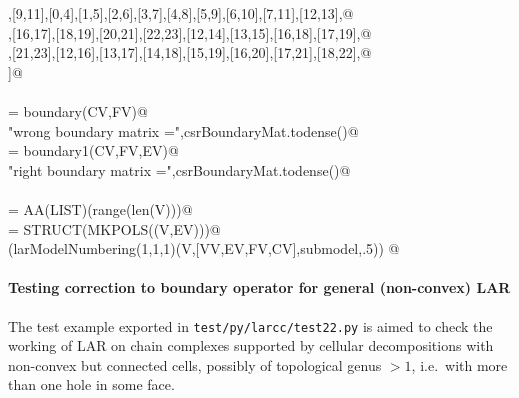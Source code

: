 \documentclass[11pt,oneside]{article}    %
\begin{document}
\begin{flushleft}
\begin{list}{}{}
\mbox{}\verb@[8,10],[9,11],[0,4],[1,5],[2,6],[3,7],[4,8],[5,9],[6,10],[7,11],[12,13],@\\
\mbox{}\verb@[14,15],[16,17],[18,19],[20,21],[22,23],[12,14],[13,15],[16,18],[17,19],@\\
\mbox{}\verb@[20,22],[21,23],[12,16],[13,17],[14,18],[15,19],[16,20],[17,21],[18,22],@\\
\mbox{}\verb@[19,23]]@\\
\mbox{}\verb@@\\
\mbox{}\verb@csrBoundaryMat = boundary(CV,FV)@\\
\mbox{}\verb@print "wrong boundary matrix =",csrBoundaryMat.todense()@\\
\mbox{}\verb@csrBoundaryMat = boundary1(CV,FV,EV)@\\
\mbox{}\verb@print "right boundary matrix =",csrBoundaryMat.todense()@\\
\mbox{}\verb@@\\
\mbox{}\verb@VV = AA(LIST)(range(len(V)))@\\
\mbox{}\verb@submodel = STRUCT(MKPOLS((V,EV)))@\\
\mbox{}\verb@VIEW(larModelNumbering(1,1,1)(V,[VV,EV,FV,CV],submodel,.5)) @\\
\mbox{}\verb@@{\NWsep}
\end{list}
\vspace{-2ex}
\end{flushleft}

\paragraph{Testing correction to boundary operator for general (non-convex) LAR}

The test example exported in \texttt{test/py/larcc/test22.py} is aimed to check the working of LAR on chain complexes supported by cellular decompositions with non-convex but connected cells, possibly of topological genus $>1$, i.e.~with more than one hole in some face.
\end{document}

